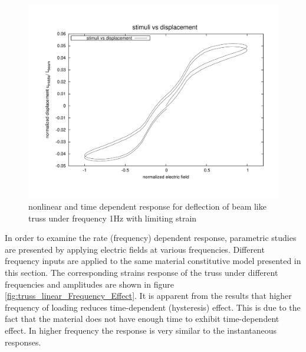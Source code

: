 \begin{figure}  
\centering
\includegraphics[width=5.0in]{./chap_5_active_trusses/images_non_linear_time_dependent_constitutive_equatio/limiting_strain_linear_tetrahedral_time_dependent_efield_vs_displacement_nonlinear.pdf}
\caption{nonlinear and time dependent response for deflection of beam like truss under frequency 1Hz with limiting strain}
\label{fig:limiting_strain_linear_tetrahedral_time_dependent_efield_vs_displacement_nonlinear}
\end{figure} 

In order to examine the rate (frequency) dependent response, parametric studies are presented by applying electric fields at various frequencies. Different frequency inputs are applied to the same material constitutive model presented in this section. The corresponding strains response of the truss under different frequencies and amplitudes are shown in figure \ref{fig:truss_linear_Frequency_Effect}. It is apparent from the results that higher frequency of loading reduces time-dependent (hysteresis) effect. This is due to the fact that the material does not have enough time to exhibit time-dependent effect. In higher frequency the response is very similar to the instantaneous responses. 


